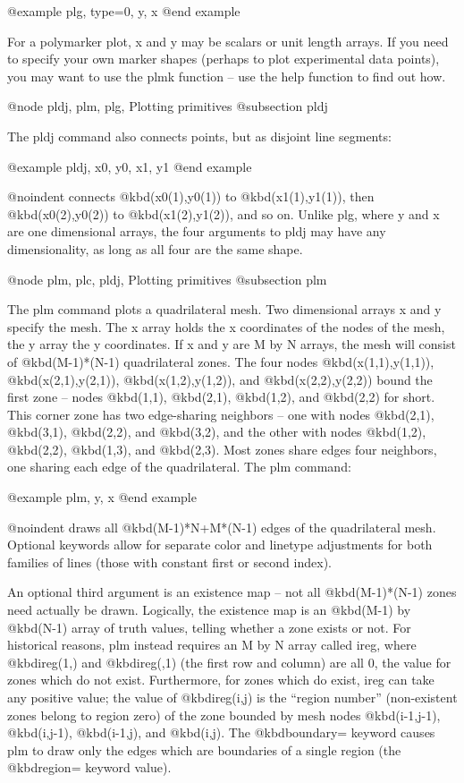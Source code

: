 @example
plg, type=0, y, x
@end example

For a polymarker plot, x and y may be scalars or unit length arrays.  If
you need to specify your own marker shapes (perhaps to plot experimental
data points), you may want to use the plmk function -- use the help
function to find out how.

@node pldj, plm, plg, Plotting primitives
@subsection pldj

The pldj command also connects points, but as disjoint line segments:

@example
pldj, x0, y0, x1, y1
@end example

@noindent
connects @kbd{(x0(1),y0(1))} to @kbd{(x1(1),y1(1))}, then
@kbd{(x0(2),y0(2))} to @kbd{(x1(2),y1(2))}, and so on.  Unlike plg,
where y and x are one dimensional arrays, the four arguments to pldj may
have any dimensionality, as long as all four are the same shape.

@node plm, plc, pldj, Plotting primitives
@subsection plm

The plm command plots a quadrilateral mesh.  Two dimensional arrays x
and y specify the mesh.  The x array holds the x coordinates of the
nodes of the mesh, the y array the y coordinates.  If x and y are M by N
arrays, the mesh will consist of @kbd{(M-1)*(N-1)} quadrilateral zones.
The four nodes @kbd{(x(1,1),y(1,1))}, @kbd{(x(2,1),y(2,1))},
@kbd{(x(1,2),y(1,2))}, and @kbd{(x(2,2),y(2,2))} bound the first zone --
nodes @kbd{(1,1)}, @kbd{(2,1)}, @kbd{(1,2)}, and @kbd{(2,2)} for short.
This corner zone has two edge-sharing neighbors -- one with nodes
@kbd{(2,1)}, @kbd{(3,1)}, @kbd{(2,2)}, and @kbd{(3,2)}, and the other
with nodes @kbd{(1,2)}, @kbd{(2,2)}, @kbd{(1,3)}, and @kbd{(2,3)}.  Most
zones share edges four neighbors, one sharing each edge of the
quadrilateral.  The plm command:

@example
plm, y, x
@end example

@noindent
draws all @kbd{(M-1)*N+M*(N-1)} edges of the quadrilateral mesh.  Optional
keywords allow for separate color and linetype adjustments for both
families of lines (those with constant first or second index).

An optional third argument is an existence map -- not all
@kbd{(M-1)*(N-1)} zones need actually be drawn.  Logically, the
existence map is an @kbd{(M-1)} by @kbd{(N-1)} array of truth values,
telling whether a zone exists or not.  For historical reasons, plm
instead requires an M by N array called ireg, where @kbd{ireg(1,)} and
@kbd{ireg(,1)} (the first row and column) are all 0, the value for zones
which do not exist.  Furthermore, for zones which do exist, ireg can
take any positive value; the value of @kbd{ireg(i,j)} is the ``region
number'' (non-existent zones belong to region zero) of the zone bounded
by mesh nodes @kbd{(i-1,j-1)}, @kbd{(i,j-1)}, @kbd{(i-1,j)}, and
@kbd{(i,j)}.  The @kbd{boundary=} keyword causes plm to draw only the
edges which are boundaries of a single region (the @kbd{region=} keyword
value).


